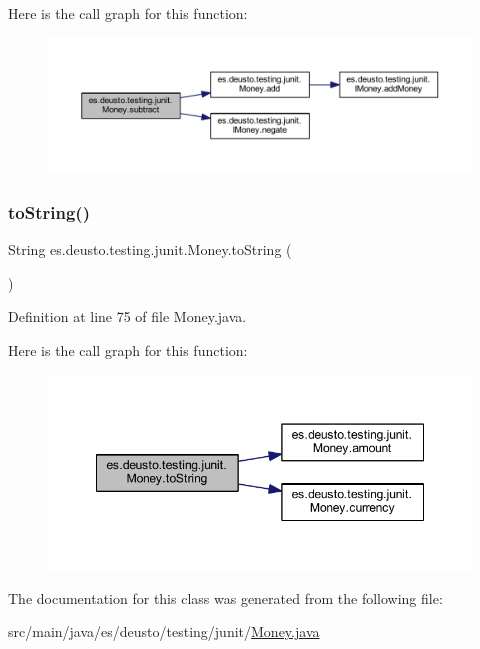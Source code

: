 Here is the call graph for this function\+:
\nopagebreak
\begin{figure}[H]
\begin{center}
\leavevmode
\includegraphics[width=350pt]{classes_1_1deusto_1_1testing_1_1junit_1_1_money_aada973cd1a31410ed2b7e5d2ae6bc2e9_cgraph}
\end{center}
\end{figure}
\mbox{\label{classes_1_1deusto_1_1testing_1_1junit_1_1_money_af9e655069123757bea0efecc4efcd638}} 
\subsubsection{\texorpdfstring{toString()}{toString()}}
{\footnotesize\ttfamily String es.\+deusto.\+testing.\+junit.\+Money.\+to\+String (\begin{DoxyParamCaption}{ }\end{DoxyParamCaption})}



Definition at line 75 of file Money.\+java.

Here is the call graph for this function\+:
\nopagebreak
\begin{figure}[H]
\begin{center}
\leavevmode
\includegraphics[width=348pt]{classes_1_1deusto_1_1testing_1_1junit_1_1_money_af9e655069123757bea0efecc4efcd638_cgraph}
\end{center}
\end{figure}


The documentation for this class was generated from the following file\+:\begin{DoxyCompactItemize}
\item 
src/main/java/es/deusto/testing/junit/\mbox{\hyperlink{_money_8java}{Money.\+java}}\end{DoxyCompactItemize}

